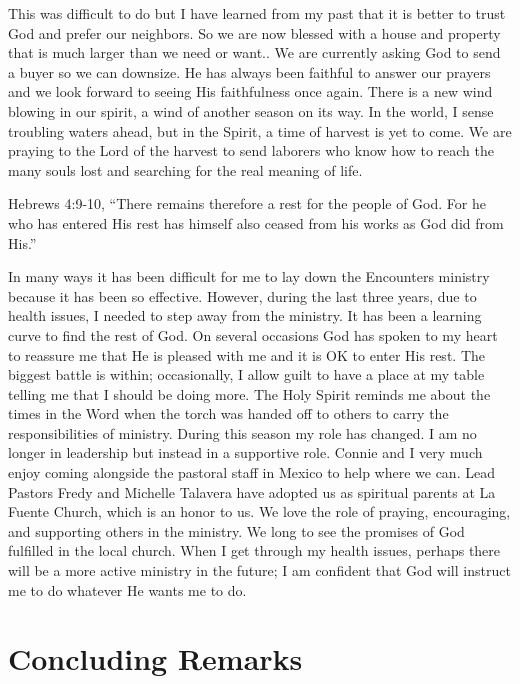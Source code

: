 \documentclass[twoside, 12pt]{book}
\begin{document}
This was difficult to do but I have learned from my past that it is better to trust God and prefer our neighbors. So we are now blessed with a house and property that is much larger than we need or want.. We are currently asking God to send a buyer so we can downsize. He has always been faithful to answer our prayers and we look forward to seeing His faithfulness once again. There is a new wind blowing in our spirit, a wind of another season on its way. In the world, I sense troubling waters ahead, but in the Spirit, a time of harvest is yet to come. We are praying to the Lord of the harvest to send laborers who know how to reach the many souls lost and searching for the real meaning of life. 

Hebrews 4:9-10, “There remains therefore a rest for the people of God. For he who has entered His rest has himself also ceased from his works as God did from His.”

In many ways it has been difficult for me to lay down the Encounters ministry because it has been so effective. However, during the last three years, due to health issues, I needed to step away from the ministry. It has been a learning curve to find the rest of God. On several occasions God has spoken to my heart to reassure me that He is pleased with me and it is OK to enter His rest. The biggest battle is within; occasionally, I allow guilt to have a place at my table telling me that I should be doing more. The Holy Spirit reminds me about the times in the Word when the torch was handed off to others to carry the responsibilities of ministry. During this season my role has changed. I am no longer in leadership but instead in a supportive role. Connie and I very much enjoy coming alongside the pastoral staff in Mexico to help where we can. Lead Pastors Fredy and Michelle Talavera have adopted us as spiritual parents at La Fuente Church, which is an honor to us. We love the role of praying, encouraging, and supporting others in the ministry. We long to see the promises of God fulfilled in the local church. When I get through my health issues, perhaps there will be a more active ministry in the future; I am confident that God will instruct me to do whatever He wants me to do.

\clearpage


\chapter{Concluding Remarks}
\
\end{document}
